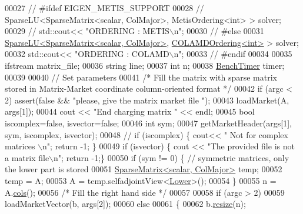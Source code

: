 \begin{DoxyCode}
00027 \textcolor{comment}{// #ifdef EIGEN\_METIS\_SUPPORT}
00028 \textcolor{comment}{//   SparseLU<SparseMatrix<scalar, ColMajor>, MetisOrdering<int> > solver; }
00029 \textcolor{comment}{//   std::cout<< "ORDERING : METIS\(\backslash\)n"; }
00030 \textcolor{comment}{// #else}
00031   \hyperlink{group___sparse_l_u___module_class_eigen_1_1_sparse_l_u}{SparseLU<SparseMatrix<scalar, ColMajor>}, 
      \hyperlink{group___ordering_methods___module_class_eigen_1_1_c_o_l_a_m_d_ordering}{COLAMDOrdering<int>} >  solver;
00032   std::cout<< \textcolor{stringliteral}{"ORDERING : COLAMD\(\backslash\)n"}; 
00033 \textcolor{comment}{// #endif}
00034   
00035   ifstream matrix\_file; 
00036   \textcolor{keywordtype}{string} line;
00037   \textcolor{keywordtype}{int}  n;
00038   \hyperlink{class_eigen_1_1_bench_timer}{BenchTimer} timer; 
00039   
00040   \textcolor{comment}{// Set parameters}
00041   \textcolor{comment}{/* Fill the matrix with sparse matrix stored in Matrix-Market coordinate column-oriented format */}
00042   \textcolor{keywordflow}{if} (argc < 2) assert(\textcolor{keyword}{false} && \textcolor{stringliteral}{"please, give the matrix market file "});
00043   loadMarket(A, args[1]);
00044   cout << \textcolor{stringliteral}{"End charging matrix "} << endl;
00045   \textcolor{keywordtype}{bool} iscomplex=\textcolor{keyword}{false}, isvector=\textcolor{keyword}{false};
00046   \textcolor{keywordtype}{int} sym;
00047   getMarketHeader(args[1], sym, iscomplex, isvector);
00048 \textcolor{comment}{//   if (iscomplex) \{ cout<< " Not for complex matrices \(\backslash\)n"; return -1; \}}
00049   \textcolor{keywordflow}{if} (isvector) \{ cout << \textcolor{stringliteral}{"The provided file is not a matrix file\(\backslash\)n"}; \textcolor{keywordflow}{return} -1;\}
00050   \textcolor{keywordflow}{if} (sym != 0) \{ \textcolor{comment}{// symmetric matrices, only the lower part is stored}
00051     \hyperlink{group___sparse_core___module_class_eigen_1_1_sparse_matrix}{SparseMatrix<scalar, ColMajor>} temp; 
00052     temp = A;
00053     A = temp.selfadjointView<\hyperlink{group__enums_gga39e3366ff5554d731e7dc8bb642f83cda891792b8ed394f7607ab16dd716f60e6}{Lower}>();
00054   \}
00055   n = A.\hyperlink{group___sparse_core___module_aa391750e3c530227e4a5c3c52e959975}{cols}();
00056   \textcolor{comment}{/* Fill the right hand side */}
00057 
00058   \textcolor{keywordflow}{if} (argc > 2)
00059     loadMarketVector(b, args[2]);
00060   \textcolor{keywordflow}{else} 
00061   \{
00062     b.\hyperlink{class_eigen_1_1_plain_object_base_a99d9054ee2d5a40c6e00ded0265e9cea}{resize}(n);

\end{DoxyCode}
